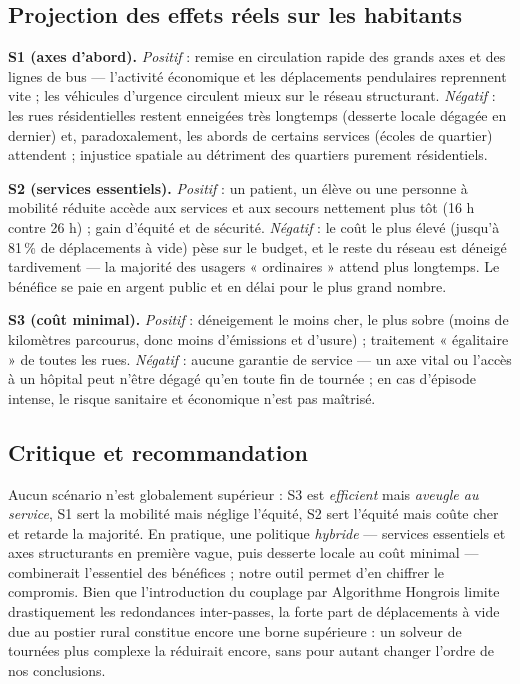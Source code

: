 \documentclass[11pt,a4paper]{article}
\begin{document}
\subsection{Projection des effets réels sur les habitants}
\textbf{S1 (axes d'abord).} \emph{Positif} : remise en circulation rapide des
grands axes et des lignes de bus — l'activité économique et les déplacements
pendulaires reprennent vite ; les véhicules d'urgence circulent mieux sur le
réseau structurant. \emph{Négatif} : les rues résidentielles restent enneigées
très longtemps (desserte locale dégagée en dernier) et, paradoxalement, les
abords de certains services (écoles de quartier) attendent ; injustice spatiale
au détriment des quartiers purement résidentiels.

\textbf{S2 (services essentiels).} \emph{Positif} : un patient, un élève ou une
personne à mobilité réduite accède aux services et aux secours nettement plus
tôt (16 h contre 26 h) ; gain d'équité et de sécurité. \emph{Négatif} : le coût
le plus élevé (jusqu'à 81\,\% de déplacements à vide) pèse sur le budget, et le
reste du réseau est déneigé tardivement — la majorité des usagers « ordinaires »
attend plus longtemps. Le bénéfice se paie en argent public et en délai pour le
plus grand nombre.

\textbf{S3 (coût minimal).} \emph{Positif} : déneigement le moins cher, le plus
sobre (moins de kilomètres parcourus, donc moins d'émissions et d'usure) ;
traitement « égalitaire » de toutes les rues. \emph{Négatif} : aucune garantie
de service — un axe vital ou l'accès à un hôpital peut n'être dégagé qu'en toute
fin de tournée ; en cas d'épisode intense, le risque sanitaire et économique
n'est pas maîtrisé.

\subsection{Critique et recommandation}
\label{sec:reco}
Aucun scénario n'est globalement supérieur : S3 est \emph{efficient} mais
\emph{aveugle au service}, S1 sert la mobilité mais néglige l'équité, S2 sert
l'équité mais coûte cher et retarde la majorité. En pratique, une politique
\emph{hybride} — services essentiels et axes structurants en première vague,
puis desserte locale au coût minimal — combinerait l'essentiel des bénéfices ;
notre outil permet d'en chiffrer le compromis. Bien que l'introduction du couplage par Algorithme Hongrois limite drastiquement les redondances inter-passes, la forte part de déplacements à vide due au postier rural constitue encore une borne supérieure : un solveur de tournées plus complexe la réduirait encore, sans pour autant changer l'ordre de nos conclusions.
\end{document}
